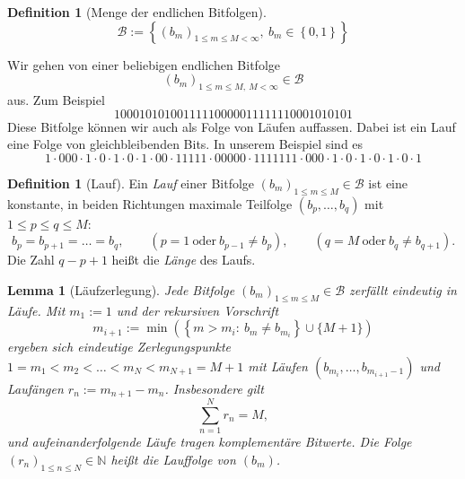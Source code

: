 \documentclass[11pt,a4paper]{scrartcl}
\theoremstyle{plain}
\newtheorem{lemma}[satz]{Lemma}
\theoremstyle{definition}
\newtheorem{defi}[satz]{Definition}
\theoremstyle{remark}
\begin{document}
\begin{defi}[Menge der endlichen Bitfolgen]\label{defi:bitfolgen}
\begin{equation}\label{eqn:mengederbitfolgen}
  \mathcal B := \left\{(b_m)_{1\leq m\leq M<\infty},\ b_m\in\left\{0,1\right\}\right\}
\end{equation}
\end{defi}

\noindent Wir gehen von einer beliebigen endlichen Bitfolge
\begin{equation}\label{eqn:beliebigebitfolge}
  (b_m)_{1\leq m\leq M,\ M<\infty}\in\mathcal B
\end{equation}
aus. Zum Beispiel
\begin{equation}\label{eqn:runtestfolge}
  10001010100111110000011111110001010101
\end{equation}
Diese Bitfolge können wir auch als Folge von Läufen auffassen. Dabei ist
ein Lauf eine Folge von gleichbleibenden Bits. In unserem Beispiel sind
es
\begin{equation}\label{eqn:runtestfolgevonlaeufen}
  1\cdot 000\cdot 1\cdot 0\cdot 1\cdot 0\cdot 1\cdot 00\cdot 11111\cdot
  00000\cdot 1111111\cdot 000\cdot 1\cdot 0\cdot 1\cdot 0\cdot 1\cdot 0\cdot 1
\end{equation}
\begin{defi}[Lauf]\label{defi:laeufe}
Ein \emph{Lauf} einer Bitfolge $(b_m)_{1\leq m\leq M}\in\mathcal B$ ist eine
konstante, in beiden Richtungen maximale Teilfolge $(b_p,\dots,b_q)$ mit
$1\leq p\leq q\leq M$:
\begin{equation}\label{eqn:mengederlaeufe}
  b_p=b_{p+1}=\dots=b_q,\qquad
  \left(p=1\ \text{oder}\ b_{p-1}\neq b_p\right),\qquad
  \left(q=M\ \text{oder}\ b_q\neq b_{q+1}\right).
\end{equation}
Die Zahl $q-p+1$ heißt die \emph{Länge} des Laufs.
\end{defi}

\begin{lemma}[Läufzerlegung]\label{lem:lzerlegung}
Jede Bitfolge $(b_m)_{1\leq m\leq M}\in\mathcal B$ zerfällt eindeutig in
Läufe. Mit $m_1:=1$ und der rekursiven Vorschrift
\begin{equation}\label{eqn:zerlegung}
  m_{i+1}:=\min\left(\left\{m>m_i:\ b_m\neq b_{m_i}\right\}\cup\{M+1\}\right)
\end{equation}
ergeben sich eindeutige Zerlegungspunkte
$1=m_1<m_2<\dots<m_N<m_{N+1}=M+1$ mit Läufen
$(b_{m_i},\dots,b_{m_{i+1}-1})$ und Laufängen $r_n:=m_{n+1}-m_n$.
Insbesondere gilt
\begin{equation}
  \sum_{n=1}^{N} r_n=M,
\end{equation}
und aufeinanderfolgende Läufe tragen komplementäre Bitwerte. Die Folge
$(r_n)_{1\leq n\leq N}\in\mathbb N$ heißt die \emph{Lauffolge} von
$(b_m)$.
\end{lemma}
\end{document}
